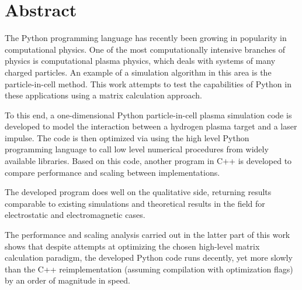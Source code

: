 \section{Abstract} %

The Python programming language has recently been growing in popularity in computational physics.
One of the most computationally intensive branches of physics is computational plasma physics,
which deals with systems of many charged particles.
An example of a simulation algorithm in this area is the particle-in-cell method.
This work attempts to test the capabilities of Python in these applications
using a matrix calculation approach. 

To this end, a one-dimensional Python particle-in-cell plasma simulation code is developed to
model the interaction between a hydrogen plasma target
and a laser impulse. The code is then optimized via using the high level Python programming
language to call low level numerical procedures from widely available
libraries. Based on this code, another program in C++ is developed to compare performance and
scaling between implementations.

The developed program does well on the qualitative side, returning results comparable to existing
simulations and theoretical results in the field for electrostatic and electromagnetic cases.

The performance and scaling analysis carried out in the latter part of this work shows
that despite attempts at optimizing the chosen high-level matrix calculation paradigm,
the developed Python code runs decently, yet more slowly than the C++ reimplementation (assuming compilation
with optimization flags) by an order of magnitude in speed.
